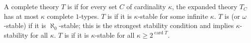 A complete theory $T$ is  if for every set $C$ of cardinality $\kappa$, the expanded theory $T_C$ has at most $\kappa$ complete $1$-types. $T$ is  if it is $\kappa$-stable for some infinite $\kappa$. $T$ is  (or $\omega$-stable) if it is $\aleph_0$-stable; this is the strongest stability condition and implies $\kappa$-stability for all $\kappa$. $T$ is  if it is $\kappa$-stable for all $\kappa \geq 2^{\operatorname{card} T}$.
